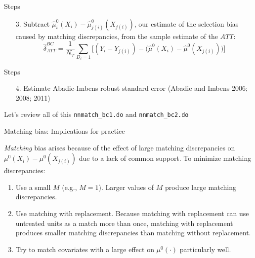 \documentclass{beamer}
\begin{document}
\begin{frame}{Steps}

\begin{enumerate}
\item[3. ] Subtract $ \widehat{\mu}_i^0(X_i) - \widehat{\mu}_{j(i)}^0(X_{j(i)})$, our estimate of the selection bias caused by matching discrepancies, from the sample estimate of the $ATT$: $$\widehat{\delta}_{ATT}^{BC} = \dfrac{1}{N_T} \sum_{D_i=1} \bigg [ (Y_i - Y_{j(i)}) - \Big(\widehat{\mu}^0(X_i) - \widehat{\mu}^0(X_{j(i)})\Big) \bigg ]$$
\end{enumerate}

\end{frame}


\begin{frame}{Steps}

\begin{enumerate}
\item[4. ] Estimate Abadie-Imbens robust standard error (Abadie and Imbens 2006; 2008; 2011)
\end{enumerate}

Let's review all of this \texttt{nnmatch_bc1.do} and \texttt{nnmatch_bc2.do}

\end{frame}






\begin{frame}{Matching bias: Implications for practice}
	
\emph{Matching} bias arises because of the effect of large matching discrepancies on $\mu^0(X_i) - \mu^0(X_{j(i)})$ due to a lack of common support. To minimize matching discrepancies:
	\begin{enumerate}
	\item Use a small $M$ (e.g., $M=1$). Larger values of $M$ produce large matching discrepancies.
	\item Use matching with replacement.  Because matching with replacement can use untreated units as a match more than once, matching with replacement produces smaller matching discrepancies than matching without replacement.
	\item Try to match covariates with a large effect on $\mu^0(\cdot)$ particularly well.
	\end{enumerate}
\end{frame}
\end{document}
